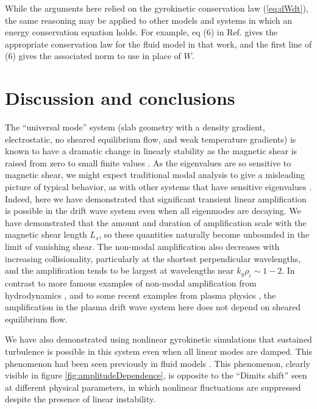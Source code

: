 \documentclass[12pt,superscriptaddress]{revtex4}
\begin{document}
While the arguments here relied on the gyrokinetic conservation law (\ref{eq:dWdt}), the same reasoning may be applied to
other models and systems in which an energy conservation equation holds. For example,
eq (6) in Ref. \cite{Drake} gives the appropriate conservation law for the fluid model
in that work, and the first line of (6) gives the associated norm to use in place of $W$.


\section{Discussion and conclusions}
\label{sec:conclusions}

The ``universal mode'' system (slab geometry with a density gradient, electrostatic,
no sheared equilibrium flow, and weak temperature gradients)
is known to have a dramatic change in linearly stability
as the magnetic shear is raised from zero to small finite values
\cite{Ross, Tsang, Antonsen,usUniversalInstability}.
As the eigenvalues are so sensitive to magnetic shear,
we might expect traditional modal analysis to
give a misleading picture of typical behavior,
as with other systems that have sensitive eigenvalues \cite{TrefethenEmbree}.
Indeed, here we have demonstrated that significant
transient linear amplification is possible in the drift wave system even when
all eigenmodes are decaying.
We have demonstrated that the amount and duration of amplification scale
with the magnetic shear length $L_s$, so these quantities naturally become
unbounded in the limit of vanishing shear.
The non-modal amplification also decreases with increasing collisionality,
particularly at the shortest perpendicular wavelengths,
and the amplification tends to be largest at wavelengths near $k_y \rho_i \sim 1-2$.
In contrast to more famous examples of non-modal amplification
from hydrodynamics \cite{TrefethenSubcritical}, and to some recent examples from plasma physics \cite{Newton, Alex, BarnesRotation, EdmundPRL},
the amplification in the plasma drift wave system here
does not depend on sheared equilibrium flow.

We have also demonstrated using nonlinear gyrokinetic simulations
that sustained turbulence is possible in this system
even when all linear modes are damped.
This phenomenon had been seen previously
in fluid models \cite{Scott1, Scott2, Drake}.
This phenomenon, clearly visible in figure \ref{fig:amplitudeDependence},
is opposite to the ``Dimits shift'' \cite{Dimits} seen at different physical parameters,
in which nonlinear fluctuations
are suppressed despite the presence of linear instability.
\end{document}
